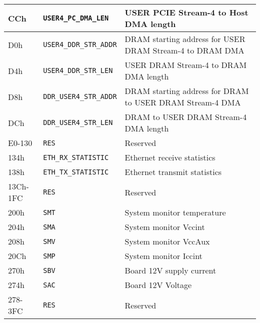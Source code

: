 \begin{longtable}{|l|l|p{9cm}|}
    CCh          &  {\texttt{USER4\_PC\_DMA\_LEN  }}           &  USER PCIE Stream-4 to Host DMA length    \\\hline
    D0h          &  {\texttt{USER4\_DDR\_STR\_ADDR}}           &  DRAM starting address for USER DRAM Stream-4 to DRAM DMA     \\\hline
    D4h          &  {\texttt{USER4\_DDR\_STR\_LEN }}           &  USER DRAM Stream-4 to DRAM DMA length    \\\hline
    D8h          &  {\texttt{DDR\_USER4\_STR\_ADDR}}           &  DRAM starting address for DRAM to USER DRAM Stream-4 DMA    \\\hline
    DCh          &  {\texttt{DDR\_USER4\_STR\_LEN }}           &  DRAM to USER DRAM Stream-4 DMA length    \\\hline
    E0-130       &  {\texttt{RES                  }}           &  Reserved    \\\hline
    134h         &  {\texttt{ETH\_RX\_STATISTIC   }}           &  Ethernet receive statistics    \\\hline
    138h         &  {\texttt{ETH\_TX\_STATISTIC   }}           &  Ethernet transmit statistics    \\\hline
    13Ch-1FC     &  {\texttt{RES                  }}           &  Reserved    \\\hline
    200h         &  {\texttt{SMT                  }}           &  System monitor temperature    \\\hline
    204h         &  {\texttt{SMA                  }}           &  System monitor Vccint    \\\hline
    208h         &  {\texttt{SMV                  }}           &  System monitor VccAux    \\\hline
    20Ch         &  {\texttt{SMP                  }}           &  System monitor Iccint    \\\hline
    270h         &  {\texttt{SBV                  }}           &  Board 12V supply current    \\\hline
    274h         &  {\texttt{SAC                  }}           &  Board 12V Voltage    \\\hline
    278-3FC      &  {\texttt{RES                  }}           &  Reserved    \\\hline
\end{longtable}    